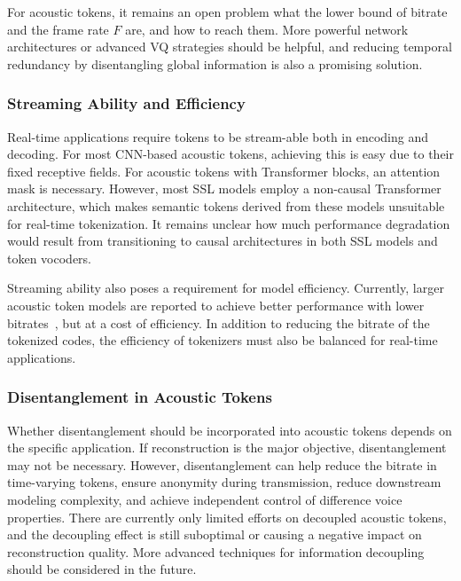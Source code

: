 For acoustic tokens, it remains an open problem what the lower bound of bitrate and the frame rate $F$ are, and how to reach them.
More powerful network architectures or advanced VQ strategies should be helpful, and reducing temporal redundancy by disentangling global information is also a promising solution.

\vspace{0.05in}
\subsubsection{Streaming Ability and Efficiency}
Real-time applications require tokens to be stream-able both in encoding and decoding.
For most CNN-based acoustic tokens, achieving this is easy due to their fixed receptive fields.
For acoustic tokens with Transformer blocks, an attention mask is necessary.
However, most SSL models employ a non-causal Transformer architecture, which makes semantic tokens derived from these models unsuitable for real-time tokenization.
It remains unclear how much performance degradation would result from transitioning to causal architectures in both SSL models and token vocoders.

Streaming ability also poses a requirement for model efficiency.
Currently, larger acoustic token models are reported to achieve better performance with lower bitrates~\cite{xin2024bigcodec,parker2024scalingtransformerslowbitratehighquality}, but at a cost of efficiency.
In addition to reducing the bitrate of the tokenized codes, the efficiency of tokenizers must also be balanced for real-time applications.

\vspace{0.05in}
\subsubsection{Disentanglement in Acoustic Tokens}
Whether disentanglement should be incorporated into acoustic tokens depends on the specific application.
If reconstruction is the major objective, disentanglement may not be necessary.
However, disentanglement can help reduce the bitrate in time-varying tokens, ensure anonymity during transmission, reduce downstream modeling complexity, and achieve independent control of difference voice properties.
There are currently only limited efforts on decoupled acoustic tokens, and the decoupling effect is still suboptimal or causing a negative impact on reconstruction quality.
More advanced techniques for information decoupling should be considered in the future.

